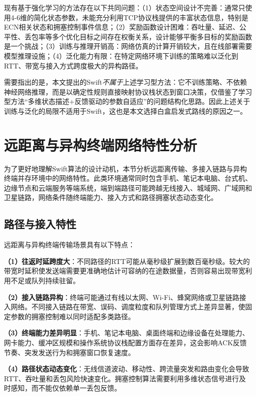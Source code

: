 现有基于强化学习的方法存在以下共同问题：（1）状态空间设计不完善：通常只使用4-6维的简化状态参数，未能充分利用TCP协议栈提供的丰富状态信息，特别是ECN相关状态和拥塞控制事件信息；（2）奖励函数设计困难：吞吐量、延迟、公平性、丢包率等多个优化目标之间存在权衡关系，设计能够平衡多目标的奖励函数是一个挑战；（3）训练与推理开销高：网络仿真的计算开销较大，且在线部署需要模型推理设施；（4）泛化能力有限：在特定网络环境下训练的策略难以泛化到RTT、带宽与接入方式跨度极大的异构路径。

需要指出的是，本文提出的Swift\emph{不属于}上述学习型方法：它不训练策略、不依赖神经网络推理，而是以确定性规则直接映射协议栈状态到窗口决策，仅借鉴了学习型方法“多维状态描述+反馈驱动的参数自适应”的问题结构化思路。因此上述关于训练与泛化的局限不适用于Swift，这也是本文选择白盒启发式路线的原因之一。

\section{远距离与异构终端网络特性分析}

为了更好地理解Swift算法的设计动机，本节分析远距离传输、多接入链路与异构终端并存环境中的网络特性。此类环境通常同时包含手机、笔记本电脑、台式机、边缘节点和云端服务等端系统，端到端路径可能跨越无线接入、城域网、广域网和卫星链路，网络条件随终端能力、接入方式和路径拥塞状态动态变化。

\subsection{路径与接入特性}

远距离与异构终端传输场景具有以下特点：

\textbf{（1）往返时延跨度大}：不同路径的RTT可能从毫秒级扩展到数百毫秒级。较大的带宽时延积使发送端需要更准确地估计可容纳的在途数据量，否则容易出现带宽利用不足或队列持续驻留。

\textbf{（2）接入链路异构}：终端可能通过有线以太网、Wi-Fi、蜂窝网络或卫星链路接入网络。不同接入链路在带宽、误码、调度粒度和队列管理方式上差异显著，使固定参数的拥塞控制难以同时适配多类路径。

\textbf{（3）终端能力差异明显}：手机、笔记本电脑、桌面终端和边缘设备在处理能力、网卡能力、缓冲区规模和操作系统协议栈配置方面存在差异，这会影响ACK反馈节奏、突发发送行为和拥塞窗口恢复速度。

\textbf{（4）路径状态动态变化}：无线信道波动、移动性、跨流量突发和路由变化会导致RTT、吞吐量和丢包风险快速变化。拥塞控制算法需要利用多维状态信号进行及时感知，而不能仅依赖单一丢包反馈。

